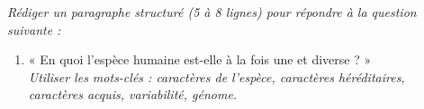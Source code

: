 \documentclass[11pt]{article}
\begin{document}
\begin{exercice}
\emph{Rédiger un paragraphe structuré (5 à 8 lignes) pour répondre à la question suivante :}
\begin{enumerate}
    \item « En quoi l'espèce humaine est-elle à la fois une et diverse ? » \\
    \textit{Utiliser les mots-clés : caractères de l'espèce, caractères héréditaires, caractères acquis, variabilité, génome.}
\end{enumerate}
\end{exercice}
\end{document}
